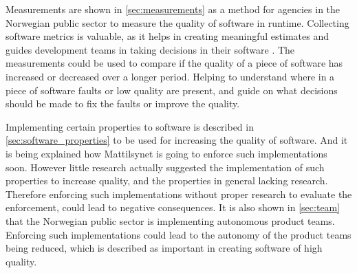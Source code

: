 
Measurements are shown in \autoref{sec:measurements} as a method for agencies in the Norwegian public sector to measure the quality of software in runtime. Collecting software metrics is valuable, as it helps in creating meaningful estimates and guides development teams in taking decisions in their software \cite{jkc_2010}. The measurements could be used to compare if the quality of a piece of software has increased or decreased over a longer period. Helping to understand where in a piece of software faults or low quality are present, and guide on what decisions should be made to fix the faults or improve the quality.


Implementing certain properties to software is described in \autoref{sec:software_properties} to be used for increasing the quality of software. And it is being explained how Mattilsynet is going to enforce such implementations soon. However little research actually suggested the implementation of such properties to increase quality, and the properties in general lacking research. Therefore enforcing such implementations without proper research to evaluate the enforcement, could lead to negative consequences. It is also shown in \autoref{sec:team} that the Norwegian public sector is implementing autonomous product teams. Enforcing such implementations could lead to the autonomy of the product teams being reduced, which is described as important in creating software of high quality.

